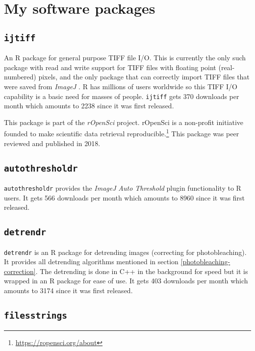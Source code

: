 \documentclass[12pt,]{book}
\let\rmarkdownfootnote\footnote%
\def\footnote{\protect\rmarkdownfootnote}
\theoremstyle{definition}
\theoremstyle{definition}
\theoremstyle{definition}
\theoremstyle{remark}
\begin{document}
\section{My software packages}\label{my-software-packages}

\subsection{\texorpdfstring{\texttt{ijtiff}}{ijtiff}}\label{ijtiff}

An R package for general purpose TIFF file I/O. This is currently the
only such package with read and write support for TIFF files with
floating point (real-numbered) pixels, and the only package that can
correctly import TIFF files that were saved from \emph{ImageJ}
\citep{ImageJ}. R has millions of users worldwide so this TIFF I/O
capability is a basic need for masses of people. \texttt{ijtiff} gets
370 downloads per month which amounts to 2238 since it was first
released.

This package is part of the \emph{rOpenSci} project. rOpenSci is a
non-profit initiative founded to make scientific data retrieval
reproducible.\footnote{\url{https://ropensci.org/about}} This package
was peer reviewed and published in 2018.\citep{ijtiff}

\subsection{\texorpdfstring{\texttt{autothresholdr}}{autothresholdr}}\label{autothresholdr}

\texttt{autothresholdr} provides the \emph{ImageJ} \citep{ImageJ}
\emph{Auto Threshold} plugin \citep{autothresholdr} functionality to R
users. It gets 566 downloads per month which amounts to 8960 since it
was first released.

\subsection{\texorpdfstring{\texttt{detrendr}}{detrendr}}\label{detrendr}

\texttt{detrendr} is an R package for detrending images (correcting for
photobleaching). It provides all detrending algorithms mentioned in
section \ref{photobleaching-correction}. The detrending is done in C++
in the background for speed but it is wrapped in an R package for ease
of use. It gets 403 downloads per month which amounts to 3174 since it
was first released.

\subsection{\texorpdfstring{\texttt{filesstrings}}{filesstrings}}\label{filesstrings}
\end{document}
